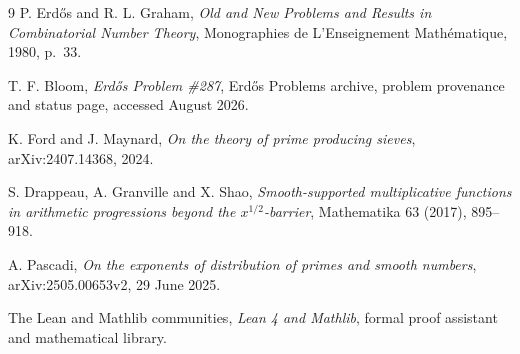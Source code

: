 \documentclass[11pt]{article}
\theoremstyle{definition}
\newcommand{\1}{\mathbf 1}
\begin{document}
\begin{thebibliography}{9}
P. Erd\H{o}s and R. L. Graham,
\emph{Old and New Problems and Results in Combinatorial Number Theory},
Monographies de L'Enseignement Math\'ematique, 1980, p.~33.

T. F. Bloom,
\emph{Erd\H{o}s Problem \#287}, Erd\H{o}s Problems archive,
problem provenance and status page, accessed August 2026.

K. Ford and J. Maynard,
\emph{On the theory of prime producing sieves},
arXiv:2407.14368, 2024.

S. Drappeau, A. Granville and X. Shao,
\emph{Smooth-supported multiplicative functions in arithmetic progressions beyond the
$x^{1/2}$-barrier}, Mathematika 63 (2017), 895--918.

A. Pascadi,
\emph{On the exponents of distribution of primes and smooth numbers},
arXiv:2505.00653v2, 29 June 2025.

The Lean and Mathlib communities,
\emph{Lean 4 and Mathlib}, formal proof assistant and mathematical library.
\end{thebibliography}
\end{document}
